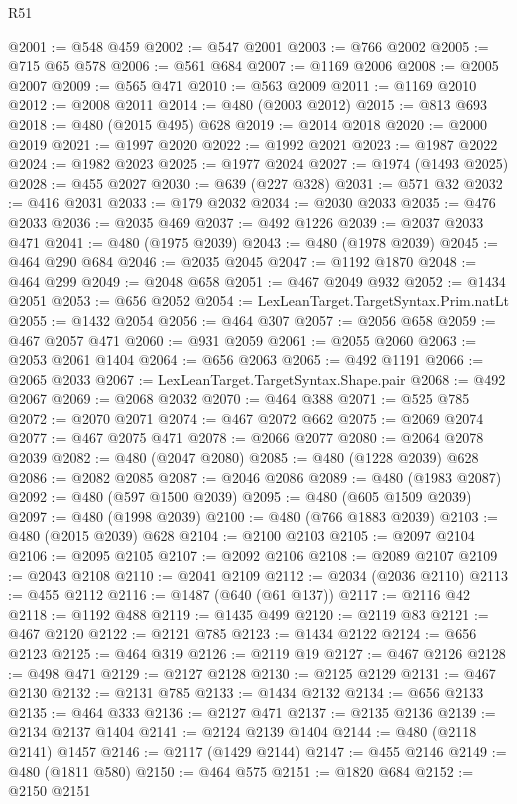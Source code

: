 \begin{lexlean}{R51}
\begin{coremodule}
@2001 := @548 @459
@2002 := @547 @2001
@2003 := @766 @2002
@2005 := @715 @65 @578
@2006 := @561 @684
@2007 := @1169 @2006
@2008 := @2005 @2007
@2009 := @565 @471
@2010 := @563 @2009
@2011 := @1169 @2010
@2012 := @2008 @2011
@2014 := @480 (@2003 @2012)
@2015 := @813 @693
@2018 := @480 (@2015 @495) @628
@2019 := @2014 @2018
@2020 := @2000 @2019
@2021 := @1997 @2020
@2022 := @1992 @2021
@2023 := @1987 @2022
@2024 := @1982 @2023
@2025 := @1977 @2024
@2027 := @1974 (@1493 @2025)
@2028 := @455 @2027
@2030 := @639 (@227 @328)
@2031 := @571 @32
@2032 := @416 @2031
@2033 := @179 @2032
@2034 := @2030 @2033
@2035 := @476 @2033
@2036 := @2035 @469
@2037 := @492 @1226
@2039 := @2037 @2033 @471
@2041 := @480 (@1975 @2039)
@2043 := @480 (@1978 @2039)
@2045 := @464 @290 @684
@2046 := @2035 @2045
@2047 := @1192 @1870
@2048 := @464 @299
@2049 := @2048 @658
@2051 := @467 @2049 @932
@2052 := @1434 @2051
@2053 := @656 @2052
@2054 := LexLeanTarget.TargetSyntax.Prim.natLt
@2055 := @1432 @2054
@2056 := @464 @307
@2057 := @2056 @658
@2059 := @467 @2057 @471
@2060 := @931 @2059
@2061 := @2055 @2060
@2063 := @2053 @2061 @1404
@2064 := @656 @2063
@2065 := @492 @1191
@2066 := @2065 @2033
@2067 := LexLeanTarget.TargetSyntax.Shape.pair
@2068 := @492 @2067
@2069 := @2068 @2032
@2070 := @464 @388
@2071 := @525 @785
@2072 := @2070 @2071
@2074 := @467 @2072 @662
@2075 := @2069 @2074
@2077 := @467 @2075 @471
@2078 := @2066 @2077
@2080 := @2064 @2078 @2039
@2082 := @480 (@2047 @2080)
@2085 := @480 (@1228 @2039) @628
@2086 := @2082 @2085
@2087 := @2046 @2086
@2089 := @480 (@1983 @2087)
@2092 := @480 (@597 @1500 @2039)
@2095 := @480 (@605 @1509 @2039)
@2097 := @480 (@1998 @2039)
@2100 := @480 (@766 @1883 @2039)
@2103 := @480 (@2015 @2039) @628
@2104 := @2100 @2103
@2105 := @2097 @2104
@2106 := @2095 @2105
@2107 := @2092 @2106
@2108 := @2089 @2107
@2109 := @2043 @2108
@2110 := @2041 @2109
@2112 := @2034 (@2036 @2110)
@2113 := @455 @2112
@2116 := @1487 (@640 (@61 @137))
@2117 := @2116 @42
@2118 := @1192 @488
@2119 := @1435 @499
@2120 := @2119 @83
@2121 := @467 @2120
@2122 := @2121 @785
@2123 := @1434 @2122
@2124 := @656 @2123
@2125 := @464 @319
@2126 := @2119 @19
@2127 := @467 @2126
@2128 := @498 @471
@2129 := @2127 @2128
@2130 := @2125 @2129
@2131 := @467 @2130
@2132 := @2131 @785
@2133 := @1434 @2132
@2134 := @656 @2133
@2135 := @464 @333
@2136 := @2127 @471
@2137 := @2135 @2136
@2139 := @2134 @2137 @1404
@2141 := @2124 @2139 @1404
@2144 := @480 (@2118 @2141) @1457
@2146 := @2117 (@1429 @2144)
@2147 := @455 @2146
@2149 := @480 (@1811 @580)
@2150 := @464 @575
@2151 := @1820 @684
@2152 := @2150 @2151

\end{coremodule}
\end{lexlean}

